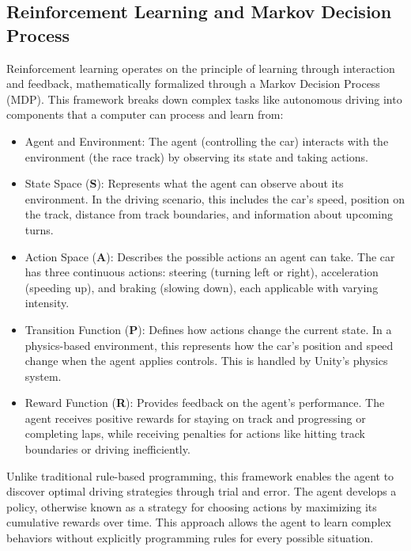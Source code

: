 \documentclass[10pt,twocolumn]{article}
\begin{document}
\subsection{Reinforcement Learning and Markov Decision Process}
Reinforcement learning operates on the principle of learning through interaction and feedback, mathematically formalized through a Markov Decision Process (MDP)\cite{MarkovDecisionProcess}. This framework breaks down complex tasks like autonomous driving into components that a computer can process and learn from:
\begin{itemize}
\item Agent and Environment: The agent (controlling the car) interacts with the environment (the race track) by observing its state and taking actions.
    \item State Space (\textbf{S}): Represents what the agent can observe about its environment. In the driving scenario, this includes the car's speed, position on the track, distance from track boundaries, and information about upcoming turns.

    \item Action Space (\textbf{A}): Describes the possible actions an agent can take. The car has three continuous actions: steering (turning left or right), acceleration (speeding up), and braking (slowing down), each applicable with varying intensity.

    \item Transition Function (\textbf{P}): Defines how actions change the current state. In a physics-based environment, this represents how the car's position and speed change when the agent applies controls. This is handled by Unity's physics system.

    \item Reward Function (\textbf{R}): Provides feedback on the agent's performance. The agent receives positive rewards for staying on track and progressing or completing laps, while receiving penalties for actions like hitting track boundaries or driving inefficiently.
\end{itemize}

Unlike traditional rule-based programming, this framework enables the agent to discover optimal driving strategies through trial and error. The agent develops a policy, otherwise known as a strategy for choosing actions by maximizing its cumulative rewards over time. This approach allows the agent to learn complex behaviors without explicitly programming rules for every possible situation.
\end{document}
